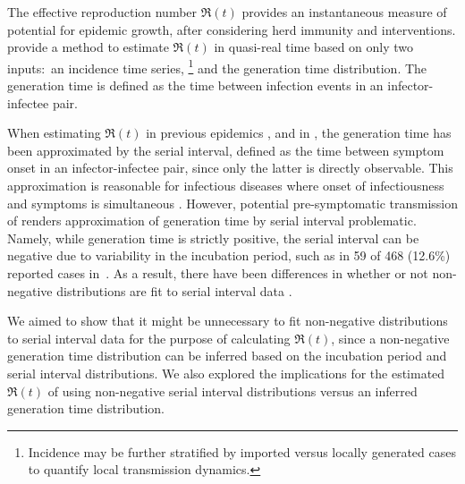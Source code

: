 The effective reproduction number $\Re(t)$ provides
an instantaneous measure of potential for epidemic growth,
after considering herd immunity and interventions.
\textcite{Cori2013} provide a method to estimate $\Re(t)$
in quasi-real time based on only two inputs:\
an incidence time series,%
\footnote{Incidence may be further stratified by
  imported versus locally generated cases
  to quantify local transmission dynamics.}
and the generation time distribution.
The generation time is defined as
the time between infection events in an infector-infectee pair.
\par
When estimating $\Re(t)$
in previous epidemics \cite{Cori2013,Ali2013,Aylward2014},
and in \covid \cite{Pan2020,Cowling2020,Leung2020,Liu2020},
the generation time has been approximated by the serial interval,
defined as the time between symptom onset in an infector-infectee pair,
since only the latter is directly observable.
This approximation is reasonable for infectious diseases
where onset of infectiousness and symptoms is simultaneous \cite{Cori2013}.
However, potential pre-symptomatic transmission of \covid
\cite{Kimball2020,Du2020}
renders approximation of generation time by serial interval problematic.
Namely, while generation time is strictly positive,
the serial interval can be negative due to
variability in the incubation period,
such as in 59 of 468 (12.6\%) reported cases in~\cite{Du2020}.
As a result, there have been differences in
whether or not non-negative distributions are fit
to \covid serial interval data
\cite{Du2020,Zhang2020,Nishiura2020,Ganyani2020}.
\par
We aimed to show that it might be unnecessary to
fit non-negative distributions to serial interval data
for the purpose of calculating $\Re(t)$,
since a non-negative generation time distribution can be inferred
based on the incubation period and serial interval distributions.
We also explored the implications for the estimated $\Re(t)$
of using non-negative serial interval distributions
versus an inferred generation time distribution.
